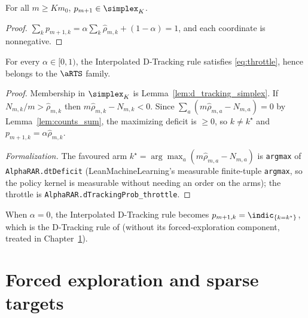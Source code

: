 \begin{lemma}\label{lem:d_tracking_simplex}
\leanok
{}
For all $m \ge K m_0$, $p_{m+1} \in \simplex_K$.
\end{lemma}

\begin{proof}\leanok
$\sum_k p_{m+1,k} = \alpha \sum_k \hat{\rho}_{m,k} + (1-\alpha) = 1$, and each
coordinate is nonnegative.
\end{proof}

\begin{lemma}\label{lem:d_tracking_isARTS}
\leanok
{}
For every $\alpha \in [0,1)$, the Interpolated D-Tracking rule satisfies
\eqref{eq:throttle}, hence belongs to the $\aRTS$ family.
\end{lemma}

\begin{proof}\leanok
{}
Membership in $\simplex_K$ is Lemma~\ref{lem:d_tracking_simplex}.
If $N_{m,k}/m > \hat{\rho}_{m,k}$ then $m\hat{\rho}_{m,k} - N_{m,k} < 0$. Since
$\sum_a (m\hat{\rho}_{m,a} - N_{m,a}) = 0$ by Lemma~\ref{lem:counts_sum}, the
maximizing deficit is $\ge 0$, so $k \ne k^\star$ and
$p_{m+1,k} = \alpha\hat{\rho}_{m,k}$.

\emph{Formalization.} The favoured arm $k^\star=\arg\max_a(m\hat\rho_{m,a}-N_{m,a})$ is
\texttt{argmax} of \texttt{AlphaRAR.dtDeficit} (LeanMachineLearning's measurable finite-tuple
\texttt{argmax}, so the policy kernel is measurable without needing an order on the arms); the
throttle is \texttt{AlphaRAR.dTrackingProb\_throttle}.
\end{proof}

\begin{remark}\label{rem:d_tracking_zero}
When $\alpha = 0$, the Interpolated D-Tracking rule becomes
$p_{m+1,k} = \indic_{\{k = k^\star\}}$, which is the D-Tracking rule of
\cite{garivier2016optimal} (without its forced-exploration component, treated in
Chapter~\ref{chap:forced}).
\end{remark}


\chapter{Forced exploration and sparse targets}
\label{chap:forced}


